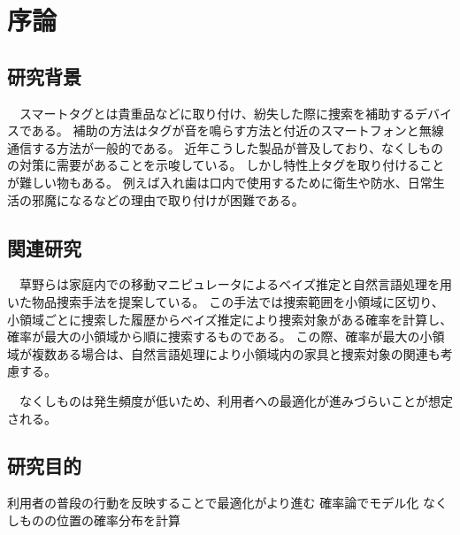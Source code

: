 \chapter{序論}


\section{研究背景}
　スマートタグとは貴重品などに取り付け、紛失した際に捜索を補助するデバイスである。
補助の方法はタグが音を鳴らす方法と付近のスマートフォンと無線通信する方法が一般的である。
近年こうした製品が普及しており、なくしものの対策に需要があることを示唆している。
しかし特性上タグを取り付けることが難しい物もある。
例えば入れ歯は口内で使用するために衛生や防水、日常生活の邪魔になるなどの理由で取り付けが困難である。

\section{関連研究}
　草野らは家庭内での移動マニピュレータによるベイズ推定と自然言語処理を用いた物品捜索手法を提案している。\cite{kusano}
この手法では捜索範囲を小領域に区切り、小領域ごとに捜索した履歴からベイズ推定により捜索対象がある確率を計算し、確率が最大の小領域から順に捜索するものである。
この際、確率が最大の小領域が複数ある場合は、自然言語処理により小領域内の家具と捜索対象の関連も考慮する。

　なくしものは発生頻度が低いため、利用者への最適化が進みづらいことが想定される。

\section{研究目的}
利用者の普段の行動を反映することで最適化がより進む
確率論でモデル化
なくしものの位置の確率分布を計算

%
